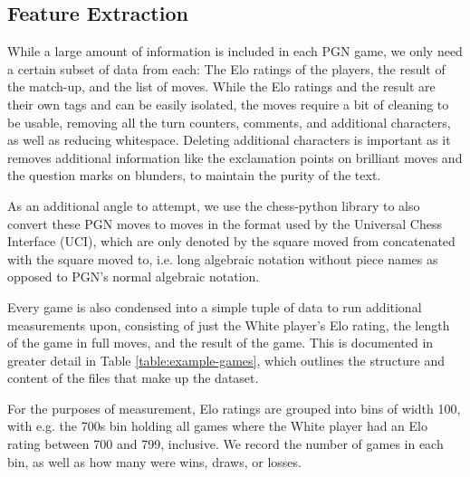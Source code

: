\documentclass[conference]{IEEEtran}
\begin{document}
\subsection{Feature Extraction}

While a large amount of information is included in each PGN game, we only need a certain subset of data from each: The Elo ratings of the players, the result of the match-up, and the list of moves. While the Elo ratings and the result are their own tags and can be easily isolated, the moves require a bit of cleaning to be usable, removing all the turn counters, comments, and additional characters, as well as reducing whitespace. Deleting additional characters is important as it removes additional information like the exclamation points on brilliant moves and the question marks on blunders, to maintain the purity of the text.

As an additional angle to attempt, we use the chess-python library to also convert these PGN moves to moves in the format used by the Universal Chess Interface (UCI), which are only denoted by the square moved from concatenated with the square moved to, i.e. long algebraic notation without piece names as opposed to PGN's normal algebraic notation.

Every game is also condensed into a simple tuple of data to run additional measurements upon, consisting of just the White player's Elo rating, the length of the game in full moves, and the result of the game. This is documented in greater detail in Table \ref{table:example-games}, which outlines the structure and content of the files that make up the dataset.

For the purposes of measurement, Elo ratings are grouped into bins of width 100, with e.g. the 700s bin holding all games where the White player had an Elo rating between 700 and 799, inclusive. We record the number of games in each bin, as well as how many were wins, draws, or losses.
\end{document}
